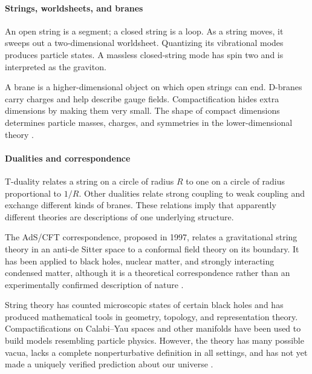 \paragraph{Strings, worldsheets, and branes}
An open string is a segment; a closed string is a loop. As a string moves, it sweeps out a two-dimensional worldsheet. Quantizing its vibrational modes produces particle states. A massless closed-string mode has spin two and is interpreted as the graviton.

A brane is a higher-dimensional object on which open strings can end. D-branes carry charges and help describe gauge fields. Compactification hides extra dimensions by making them very small. The shape of compact dimensions determines particle masses, charges, and symmetries in the lower-dimensional theory \cite{string_ref1}.

\paragraph{Dualities and correspondence}
T-duality relates a string on a circle of radius $R$ to one on a circle of radius proportional to $1/R$. Other dualities relate strong coupling to weak coupling and exchange different kinds of branes. These relations imply that apparently different theories are descriptions of one underlying structure.

The AdS/CFT correspondence, proposed in 1997, relates a gravitational string theory in an anti-de Sitter space to a conformal field theory on its boundary. It has been applied to black holes, nuclear matter, and strongly interacting condensed matter, although it is a theoretical correspondence rather than an experimentally confirmed description of nature \cite{string_ref3}.

String theory has counted microscopic states of certain black holes and has produced mathematical tools in geometry, topology, and representation theory. Compactifications on Calabi--Yau spaces and other manifolds have been used to build models resembling particle physics. However, the theory has many possible vacua, lacks a complete nonperturbative definition in all settings, and has not yet made a uniquely verified prediction about our universe \cite{string_ref4}.

